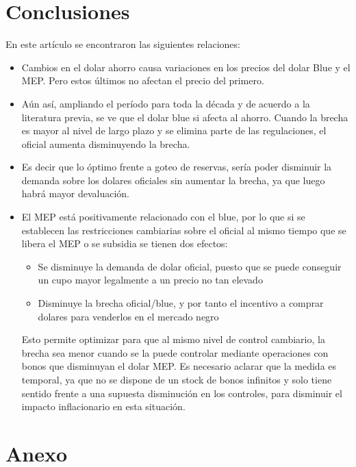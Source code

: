 \documentclass[11pt,a4paper]{article}
\begin{document}
\clearpage
\section{Conclusiones}
En este artículo se encontraron las siguientes relaciones:
\begin{itemize}
\item Cambios en el dolar ahorro causa variaciones en los precios del dolar Blue y el MEP. Pero estos últimos no afectan el precio del primero.
\item Aún así, ampliando el período para toda la década y de acuerdo a la literatura previa, se ve que el dolar blue si afecta al ahorro. Cuando la brecha es mayor al nivel de largo plazo y se elimina parte de las regulaciones, el oficial aumenta disminuyendo la brecha. 
\item Es decir que lo óptimo frente a goteo de reservas, sería poder disminuir la demanda sobre los dolares oficiales sin aumentar la brecha, ya que luego habrá mayor devaluación. 
\item El MEP está positivamente relacionado con el blue, por lo que si se establecen las restricciones cambiarias sobre el oficial al mismo tiempo que se libera el MEP o se subsidia se tienen dos efectos:
\begin{itemize}
\item Se disminuye la demanda de dolar oficial, puesto que se puede conseguir un cupo mayor legalmente a un precio no tan elevado
\item Disminuye la brecha oficial/blue, y por tanto el incentivo a comprar dolares para venderlos en el mercado negro
\end{itemize}
Esto permite optimizar para que al mismo nivel de control cambiario, la brecha sea menor cuando se la puede controlar mediante operaciones con bonos que disminuyan el dolar MEP. Es necesario aclarar que la medida es temporal, ya que no se dispone de un stock de bonos infinitos y solo tiene sentido frente a una supuesta disminución en los controles, para disminuir el impacto inflacionario en esta situación.
\end{itemize}    

\clearpage
\section{Anexo}
\end{document}
